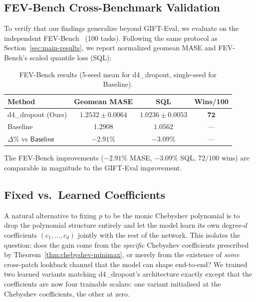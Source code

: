 \documentclass[11pt]{article}
\theoremstyle{plain}
\theoremstyle{definition}
\theoremstyle{remark}
\newcommand{\HD}{\textsf{d4\_dropout}}
\newcommand{\Baseline}{\textsf{Baseline}}
\begin{document}
\subsection{FEV-Bench Cross-Benchmark Validation}
\label{sec:fevbench}

To verify that our findings generalize beyond GIFT-Eval, we evaluate on the independent FEV-Bench~\citep{shchur2025fevbench} (100 tasks). Following the same protocol as Section~\ref{sec:main-results}, we report normalized geomean MASE and FEV-Bench's scaled quantile loss (SQL):

\begin{table}[h]
\centering
\small
\caption{FEV-Bench results (5-seed mean for \HD{}, single-seed for \Baseline{}).}
\label{tab:fevbench}
\begin{tabular}{lccc}
\toprule
\textbf{Method} & \textbf{Geomean MASE} & \textbf{SQL} & \textbf{Wins/100} \\
\midrule
\HD{} (Ours) & $\mathbf{1.2532 \pm 0.0064}$ & $\mathbf{1.0236 \pm 0.0053}$ & $\mathbf{72}$ \\
\Baseline{} & $1.2908$ & $1.0562$ & --- \\
\midrule
$\Delta\%$ vs $\Baseline{}$ & $-2.91\%$ & $-3.09\%$ & --- \\
\bottomrule
\end{tabular}
\end{table}

The FEV-Bench improvements ($-2.91\%$ MASE, $-3.09\%$ SQL, $72/100$ wins) are comparable in magnitude to the GIFT-Eval improvement. 

\subsection{Fixed vs.\ Learned Coefficients}
\label{sec:learned-fir}

A natural alternative to fixing $p$ to be the monic Chebyshev polynomial is to drop the polynomial structure entirely and let the model learn its own degree-$d$ coefficients $(c_1, \ldots, c_d)$ jointly with the rest of the network. This isolates the question: does the gain come from the \emph{specific} Chebyshev coefficients prescribed by Theorem~\ref{thm:chebyshev-minimax}, or merely from the existence of \emph{some} cross-patch lookback channel that the model can shape end-to-end? We trained two learned variants matching \HD{}'s architecture exactly except that the coefficients are now four trainable scalars: one variant initialised at the Chebyshev coefficients, the other at zero.
\end{document}
